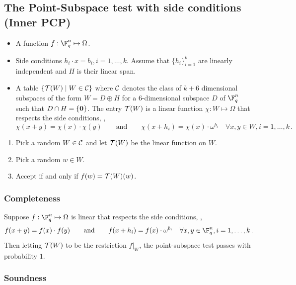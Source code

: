 \subsection{The Point-Subspace test with side conditions (Inner PCP)}\label{sec:point-subspace}

\begin{itemize}
\item A function $f: \F_q^n \mapsto \Omega$.
\item Side conditions $h_i \cdot x = b_i, i =1,\ldots, k$. Assume that $\{h_i\}_{i=1}^k$ are linearly independent and $H$ is their
    linear span.
\item A table $\left\{ {\cal T}(W) \mid  W \in {\cal C} \right\}$ where ${\cal C}$ denotes the class of $k+6$ dimensional subspaces of the form $W = D \oplus H$ for a $6$-dimensional subspace $D$ of $\F_q^n$ such that $D \cap H = \{ {\bf 0} \}$. The entry ${\cal T}(W)$ is a linear function $\chi: W \mapsto \Omega$ that respects the side conditions, \ie,
\[
\chi(x+y) = \chi(x)\cdot \chi(y)\qquad\text{and}\qquad \chi(x + h_i) =
\chi(x)\cdot  \omega^{b_i} \quad \forall x,y \in W, i=1,\ldots,k\,.
\]
\end{itemize}
\begin{enumerate}
\item Pick a random $W \in {\cal C}$ and let $ {\cal T}(W)$ be the linear function on $W$.
\item Pick a random $w \in W$.
\item Accept if and only if $f(w) = {\cal T}(W)(w)$.
\end{enumerate}

\subsubsection{Completeness}
Suppose $f: \F_q^n \mapsto \Omega$ is linear that respects the side
conditions, \ie, \[
f(x+y) = f(x)\cdot f(y) \qquad\text{and}\qquad f(x + h_i) = f(x)\cdot
\omega^{b_i} \quad \forall x,y \in \F_q^n, i=1,\ldots,k\,.
\]
Then letting
${\cal T}(W)$ to be the restriction $f|_W$, the point-subspace test passes with probability $1$.

\subsubsection{Soundness}

